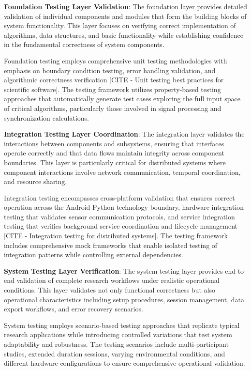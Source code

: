 \documentclass[12pt,a4paper]{report}
\begin{document}
\textbf{Foundation Testing Layer Validation}: The foundation layer provides detailed validation of individual components and
modules that form the building blocks of system functionality. This layer focuses on verifying correct implementation of
algorithms, data structures, and basic functionality while establishing confidence in the fundamental correctness of
system components.

Foundation testing employs comprehensive unit testing methodologies with emphasis on boundary condition testing, error
handling validation, and algorithmic correctness
verification [CITE - Unit testing best practices for scientific software]. The testing framework utilizes property-based
testing approaches that automatically generate test cases exploring the full input space of critical algorithms,
particularly those involved in signal processing and synchronization calculations.

\textbf{Integration Testing Layer Coordination}: The integration layer validates the interactions between components and
subsystems, ensuring that interfaces operate correctly and that data flows maintain integrity across component
boundaries. This layer is particularly critical for distributed systems where component interactions involve network
communication, temporal coordination, and resource sharing.

Integration testing encompasses cross-platform validation that ensures correct operation across the Android-Python
technology boundary, hardware integration testing that validates sensor communication protocols, and service integration
testing that verifies background service coordination and lifecycle
management [CITE - Integration testing for distributed systems]. The testing framework includes comprehensive mock
frameworks that enable isolated testing of integration patterns while controlling external dependencies.

\textbf{System Testing Layer Verification}: The system testing layer provides end-to-end validation of complete research
workflows under realistic operational conditions. This layer validates not only functional correctness but also
operational characteristics including setup procedures, session management, data export workflows, and error recovery
scenarios.

System testing employs scenario-based testing approaches that replicate typical research applications while introducing
controlled variations that test system adaptability and robustness. The testing scenarios include multi-participant
studies, extended duration sessions, varying environmental conditions, and different hardware configurations to ensure
comprehensive operational validation.
\end{document}

